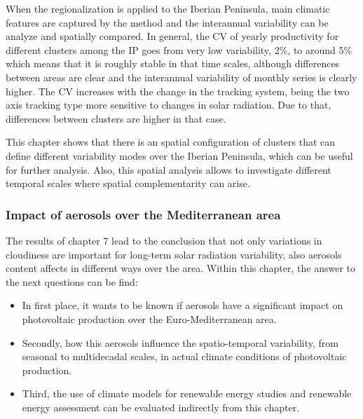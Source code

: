 When the regionalization is applied to the Iberian Peninsula, main climatic features are captured by the method and the interannual variability can be analyze and spatially compared. In general, the CV of yearly productivity for different clusters among the IP goes from very low variability, 2$\%$, to around 5$\%$ which means that it is roughly stable in that time scales, although differences between areas are clear and the interannual variability of monthly series is clearly higher. The CV increases with the change in the tracking system, being the two axis tracking type more sensitive to changes in solar radiation. Due to that, differences between clusters are higher in that case.

This chapter shows that there is an spatial configuration of clusters that can define different variability modes over the Iberian Peninsula, which can be useful for further analysis. Also, this spatial analysis allows to investigate different temporal scales where spatial complementarity can arise. %



\subsubsection{Impact of aerosols over the Mediterranean area}

The results of chapter 7 lead to the conclusion that not only variations in cloudiness are important for long-term solar radiation variability, also aerosols content affects in different ways over the area. Within this chapter, the answer to the next questions can be find:

\begin{itemize}
  
\item In first place, it wants to be known if aerosols have a significant impact on photovoltaic production over the Euro-Mediterranean area.
\item Secondly, how this aerosols influence the spatio-temporal variability, from seasonal to multidecadal scales, in actual climate conditions of photovoltaic production.
\item Third, the use of climate models for renewable energy studies and renewable energy assessment can be evaluated indirectly from this chapter.
\end{itemize}

